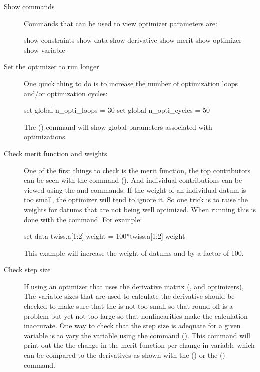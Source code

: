 {{{{{{{{\begin{description}
%
\item[Show commands] \Newline
Commands that can be used to view optimizer parameters are:
\begin{example}
  show constraints
  show data
  show derivative
  show merit
  show optimizer
  show variable
\end{example}
%
\item[Set the optimizer to run longer] \Newline
One quick thing to do is to increase the number of optimization loops and/or optimization cycles:
\begin{example}
	set global n_opti_loops = 30
	set global n_opti_cycles = 50
\end{example}
The  () command will show global parameters
associated with optimizations.
%
\item[Check merit function and weights] \Newline
One of the first things to check is the merit function, the top contributors can be seen with the
command  (). And individual contributions can be viewed using the
 and  commands. If the weight of an individual datum is too small,
the optimizer will tend to ignore it. So one trick is to raise the weights for datums that are not
being well optimized. When running \tao this is done with the  command. For example:
\begin{example}
  set data twiss.a[1:2]|weight = 100*twiss.a[1:2]|weight
\end{example}
This example will increase the weight of datums  and  by a factor of
100.
%
\item[Check step size] \Newline
If using an optimizer that uses the derivative matrix (,  and 
optimizers), The variable  sizes that are used to calculate the derivative should be
checked to make sure that the  is not too small so that round-off is a problem but yet not
too large so that nonlinearities make the calculation inaccurate. One way to check that the step
size is adequate for a given variable is to vary the variable using the command 
(). This command will print out the the change in the merit function per change in
variable which can be compared to the derivatives as shown with the 
() or the  () command.
\end{description}


}}}}}}}}
